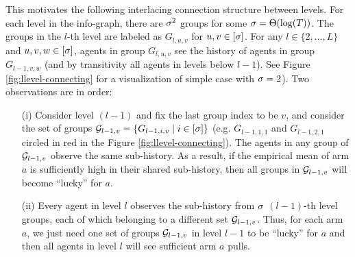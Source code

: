 This motivates the following interlacing connection structure between
levels. For each level in the info-graph, there are $\sigma^2$ groups for
some $\sigma = \Theta(\log(T))$. The groups in the $l$-th level are
labeled as $G_{l,u,v}$ for $u,v\in[\sigma]$. For any $l \in \{2,\ldots,L\}$
and $u,v,w\in [\sigma]$, agents in group $G_{l,u,v}$ see the history of
agents in group $G_{l-1,v,w}$ (and by transitivity all agents in
levels below $l-1$). See Figure \ref{fig:llevel-connecting} for a
visualization of simple case with $\sigma = 2$). Two observations are
in order:
\begin{itemize}
\item[(i)] Consider level $(l - 1)$ and fix the last group index to be
  $v$, and consider the set of groups
  $\mathcal{G}_{l-1, v}=\{G_{l-1,i,v}\mid i \in [\sigma]\}$ (e.g. $G_{l-1,1,1}$
  and $G_{l-1,2,1}$ circled in red in the Figure
  \ref{fig:llevel-connecting}). The agents in any group of
  $\mathcal{G}_{l-1, v}$ observe the same sub-history. As a result, if the
  empirical mean of arm $a$ is sufficiently high in their shared
  sub-history, then all groups in $\mathcal{G}_{l-1, v}$ will become ``lucky''
  for $a$.

\item[(ii)] Every agent in level $l$ observes the sub-history from
  $\sigma$ $(l-1)$-th level groups, each of which belonging to a
  different set $\mathcal{G}_{l-1, v}$. Thus, for each arm $a$, we just need
  one set of groups $\mathcal{G}_{l-1, v}$ in level $l-1$ to be ``lucky'' for
  $a$ and then all agents in level $l$ will see sufficient arm $a$
  pulls.
\end{itemize}

